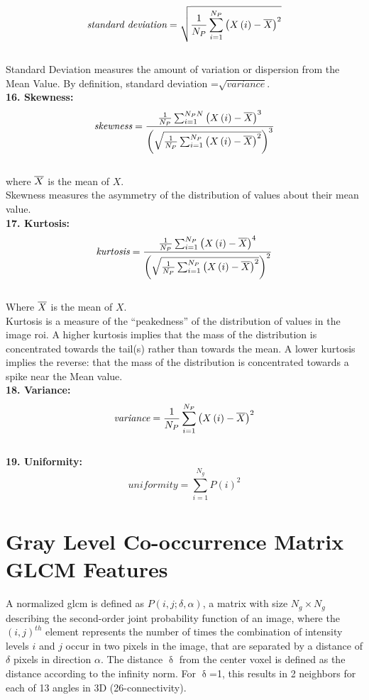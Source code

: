 \[\textit{standard deviation}=\sqrt{\frac{1}{N_{P}}\sum _{i=1}^{N_{P}}\left(X\left(i\right)-\overline{X}\right)^{2}}\]\\
{Standard Deviation measures the amount of variation or dispersion from the Mean Value. By definition, standard deviation =}$\sqrt{\textit{variance}}$.\\
{\textbf{16. Skewness:}}
\[\textit{skewness}=\frac{\frac{1}{N_{P}}\sum _{i=1}^{N_{P}N}\left(X\left(i\right)-\overline{X}\right)^{3}}{\left(\sqrt{\frac{1}{N_{P}}\sum _{i=1}^{N_{P}}\left(X\left(i\right)-\overline{X}\right)^{2}}\right)^{3}}\]\\
{where } $\overline{X}${ is the mean of} $X$.\\
Skewness measures the asymmetry of the distribution of values about their mean value.\\
\textbf{17. Kurtosis:}\\
\[\textit{kurtosis}=\frac{\frac{1}{N_{P}}\sum _{i=1}^{N_{P}}\left(X\left(i\right)-\overline{X}\right)^{4}}{\left(\sqrt{\frac{1}{N_{P}}\sum _{i=1}^{N_{P}}\left(X\left(i\right)-\overline{X}\right)^{2}}\right)^{2}}\]\\
{Where } $\overline{X}${ is the mean of} $X$.\\
{Kurtosis is a measure of the “peakedness” of the distribution of values in the image \ac{roi}. A higher kurtosis implies that the mass of the distribution is concentrated towards the tail(s) rather than towards the mean. A lower kurtosis implies the reverse: that the mass of the distribution is concentrated towards a spike near the Mean value.}\\
{\textbf{18. Variance:}}\\
\[\textit{variance}=\frac{1}{N_{P}}\sum _{i=1}^{N_{P}}\left(X\left(i\right)-\overline{X}\right)^{2}\]\\
\textbf{19. Uniformity:}\\
\[\textit{uniformity}=\sum _{i=1}^{N_{g}}P\left(i\right)^{2}\]



\section{Gray Level Co-occurrence Matrix GLCM Features}

A normalized \ac{glcm} is defined as $P\left(i,j;\delta ,\alpha \right)$, a matrix with size $N_{g}\times N_{g}$ describing the second-order joint probability function of an image, where the $\left(i,j\right)^{th}$ element represents the number of times the combination of intensity levels $i$ and $j$ occur in two pixels in the image, that are separated by a distance of $\delta $ pixels in direction $\alpha $. The distance $\updelta$ from the center voxel is defined as the distance according to the infinity norm. For $\updelta$=1, this results in 2 neighbors for each of 13 angles in 3D (26-connectivity).

